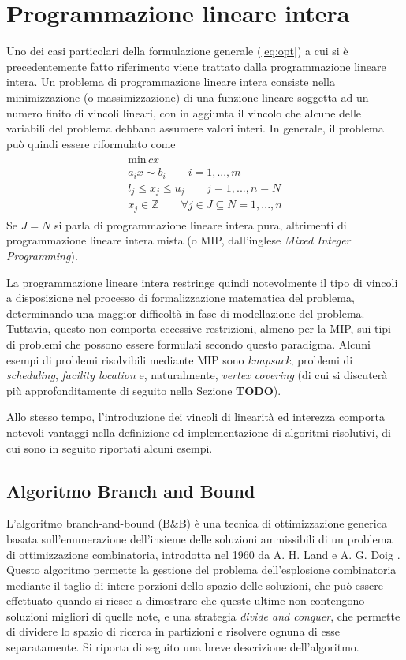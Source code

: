 \section{Programmazione lineare intera}
Uno dei casi particolari della formulazione generale (\ref{eq:opt}) a cui si è precedentemente fatto riferimento viene trattato dalla 
programmazione lineare intera.
Un problema di programmazione lineare intera consiste nella minimizzazione (o massimizzazione) di una funzione lineare soggetta ad un 
numero finito di vincoli lineari, con in aggiunta il vincolo che alcune delle variabili del problema debbano assumere valori interi. 
In generale, il problema può quindi essere riformulato come
\begin{align*}
	\label{eq:linprog}
	\begin{array}{l}
      \text{min} \, cx\\
      a_i x \sim b_i \qquad i=1,...,m \\
      l_j \leq x_j \leq u_j \qquad j=1,...,n =N \\
      x_j \in \mathbb{Z}  \qquad \forall j \in J \subseteq N = {1,...,n}	
	\end{array}
\end{align*}
\indent
Se $J=N$ si parla di programmazione lineare intera pura, altrimenti di programmazione lineare intera mista (o MIP, dall'inglese 
\textit{Mixed Integer Programming}).

La programmazione lineare intera restringe quindi notevolmente il tipo di vincoli a disposizione nel
processo di formalizzazione matematica del problema, determinando una maggior difficoltà in fase di modellazione del problema.
Tuttavia, questo non comporta eccessive restrizioni, almeno per la MIP, sui tipi di problemi che possono essere formulati secondo
questo paradigma. Alcuni esempi di problemi risolvibili mediante MIP sono \textit{knapsack}, problemi di \textit{scheduling}, 
\textit{facility location} e, naturalmente, \textit{vertex covering} (di cui si discuterà più approfonditamente di seguito
nella Sezione \textbf{TODO}).

Allo stesso tempo, l'introduzione dei vincoli di linearità ed interezza comporta notevoli vantaggi nella definizione ed
implementazione di algoritmi risolutivi, di cui sono in seguito riportati alcuni esempi. 

\subsection{Algoritmo Branch and Bound}
L'algoritmo branch-and-bound (B\&B) è una tecnica di ottimizzazione generica basata sull'enumerazione dell'insieme delle soluzioni
ammissibili di un problema di ottimizzazione combinatoria, introdotta nel 1960 da A. H. Land e A. G. Doig \cite{10.2307/1910129}. 
Questo algoritmo permette la gestione del problema dell'esplosione combinatoria mediante il taglio di intere porzioni dello spazio delle soluzioni, che può essere effettuato quando si riesce a dimostrare che queste ultime non contengono soluzioni migliori di quelle
note, e una strategia \textit{divide and conquer}, che permette di dividere lo spazio di ricerca in partizioni e risolvere ognuna di 
esse separatamente. Si riporta di seguito una breve descrizione dell'algoritmo.

